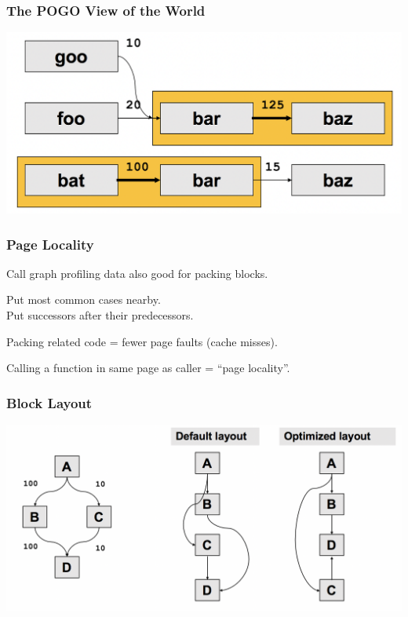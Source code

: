 \begin{frame}
\frametitle{The POGO View of the World}

\begin{center}
	\includegraphics[width=\textwidth]{images/callpaths4.png}
\end{center}

\end{frame}




\begin{frame}
\frametitle{Page Locality}

\large
\begin{changemargin}{1cm}
Call graph profiling data also good for packing blocks.

Put most common cases nearby.\\
Put successors after their predecessors.

Packing related code = fewer page faults (cache misses).

Calling a function in same page as caller =  ``page locality''.
\end{changemargin}

\end{frame}



\begin{frame}
\frametitle{Block Layout}

\begin{center}
	\includegraphics[width=\textwidth]{images/blocklayout.png}
\end{center}

\end{frame}




